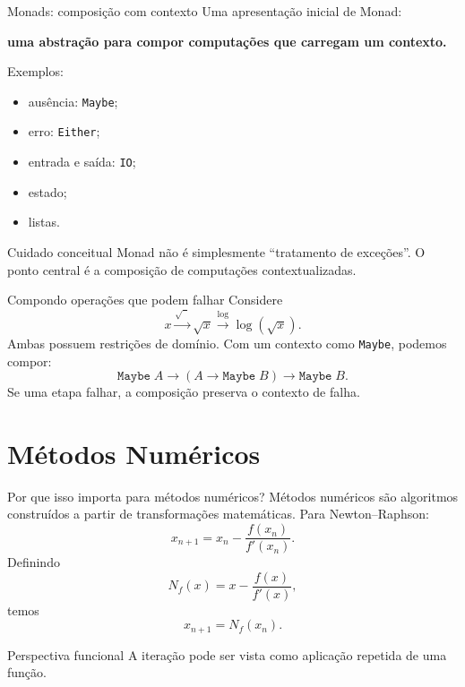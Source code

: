 \documentclass[aspectratio=169,11pt]{beamer}
\begin{document}
\begin{frame}{Monads: composição com contexto}
    Uma apresentação inicial de Monad:
    \begin{center}\textbf{uma abstração para compor computações que carregam um contexto.}\end{center}
    Exemplos:
    \begin{itemize}
        \item ausência: \texttt{Maybe};
        \item erro: \texttt{Either};
        \item entrada e saída: \texttt{IO};
        \item estado;
        \item listas.
    \end{itemize}
    \begin{block}{Cuidado conceitual}
        Monad não é simplesmente ``tratamento de exceções''. O ponto central é a composição de computações contextualizadas.
    \end{block}
\end{frame}

\begin{frame}{Compondo operações que podem falhar}
    Considere
    \[
        x\xrightarrow{\sqrt{\phantom{x}}}\sqrt{x}
        \xrightarrow{\log}\log(\sqrt{x}).
    \]
    Ambas possuem restrições de domínio. Com um contexto como \texttt{Maybe},
    podemos compor:
    \[
        \texttt{Maybe}\;A
        \longrightarrow
        (A\rightarrow\texttt{Maybe}\;B)
        \longrightarrow
        \texttt{Maybe}\;B.
    \]
    Se uma etapa falhar, a composição preserva o contexto de falha.
\end{frame}

\section{Métodos Numéricos}

\begin{frame}{Por que isso importa para métodos numéricos?}
    Métodos numéricos são algoritmos construídos a partir de transformações matemáticas.
    Para Newton--Raphson:
    \[
        x_{n+1}=x_n-\frac{f(x_n)}{f'(x_n)}.
    \]
    Definindo
    \[
        N_f(x)=x-\frac{f(x)}{f'(x)},
    \]
    temos
    \[
        x_{n+1}=N_f(x_n).
    \]
    \begin{block}{Perspectiva funcional}
        A iteração pode ser vista como aplicação repetida de uma função.
    \end{block}
\end{frame}
\end{document}
